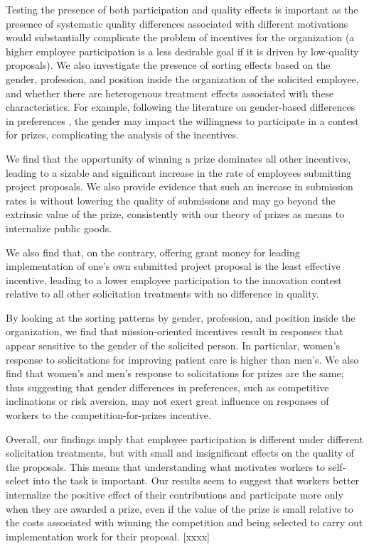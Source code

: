 \documentclass[11pt, titlepage]{article}
\begin{document}
Testing the presence of both participation and quality effects is
important as the presence of systematic quality differences associated
with different motivations would substantially complicate the problem of
incentives for the organization (a higher employee participation is a
less desirable goal if it is driven by low-quality proposals). We also
investigate the presence of sorting effects based on the gender,
profession, and position inside the organization of the solicited
employee, and whether there are heterogenous treatment effects
associated with these characteristics. For example, following the
literature on gender-based differences in preferences
\citep{croson2004gender}, the gender may impact the willingness to
participate in a contest for prizes, complicating the analysis of the
incentives.

We find that the opportunity of winning a prize dominates all other
incentives, leading to a sizable and significant increase in the rate of
employees submitting project proposals. We also provide evidence that
such an increase in submission rates is without lowering the quality of
submissions and may go beyond the extrinsic value of the prize,
consistently with our theory of prizes as means to internalize public
goods.

We also find that, on the contrary, offering grant money for leading
implementation of one's own submitted project proposal is the least
effective incentive, leading to a lower employee participation to the
innovation contest relative to all other solicitation treatments with no
difference in quality.

By looking at the sorting patterns by gender, profession, and position
inside the organization, we find that mission-oriented incentives result
in responses that appear sensitive to the gender of the solicited
person. In particular, women's response to solicitations for improving
patient care is higher than men's. We also find that women's and men's
response to solicitations for prizes are the same; thus suggesting that
gender differences in preferences, such as competitive inclinations or
risk aversion, may not exert great influence on responses of workers to
the competition-for-prizes incentive.

Overall, our findings imply that employee participation is different
under different solicitation treatments, but with small and
insignificant effects on the quality of the proposals. This means that
understanding what motivates workers to self-select into the task is
important. Our results seem to suggest that workers better internalize
the positive effect of their contributions and participate more only
when they are awarded a prize, even if the value of the prize is small
relative to the costs associated with winning the competition and being
selected to carry out implementation work for their proposal. {[}xxxx{]}
\end{document}
